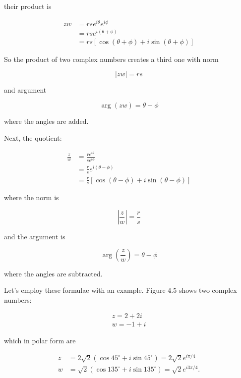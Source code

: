 their product is

$$
    \begin{aligned}
        z w & =r s e^{i \theta} e^{i \phi}                  \\
            & =r s e^{i(\theta+\phi)}                       \\
            & =r s[\cos (\theta+\phi)+i \sin (\theta+\phi)]
    \end{aligned}
$$

So the product of two complex numbers creates a third one with norm

$$
    |z w|=r s
$$

and argument

$$
    \arg (z w)=\theta+\phi
$$

where the angles are added.

Next, the quotient:

$$
    \begin{aligned}
        \frac{z}{w} & =\frac{r e^{i \theta}}{s e^{i \phi}}                  \\
                    & =\frac{r}{s} e^{i(\theta-\phi)}                       \\
                    & =\frac{r}{s}[\cos (\theta-\phi)+i \sin (\theta-\phi)]
    \end{aligned}
$$

where the norm is

$$
    \left|\frac{z}{w}\right|=\frac{r}{s}
$$

and the argument is

$$
    \arg \left(\frac{z}{w}\right)=\theta-\phi
$$

where the angles are subtracted.

Let's employ these formulae with an example. Figure 4.5 shows two complex numbers:

$$
    \begin{gathered}
        z=2+2 i \\
        w=-1+i
    \end{gathered}
$$

which in polar form are

$$
    \begin{aligned}
        z & =2 \sqrt{2}\left(\cos 45^{\circ}+i \sin 45^{\circ}\right)=2 \sqrt{2} e^{i \pi / 4}   \\
        w & =\sqrt{2}\left(\cos 135^{\circ}+i \sin 135^{\circ}\right)=\sqrt{2} e^{i 3 \pi / 4} .
    \end{aligned}
$$

